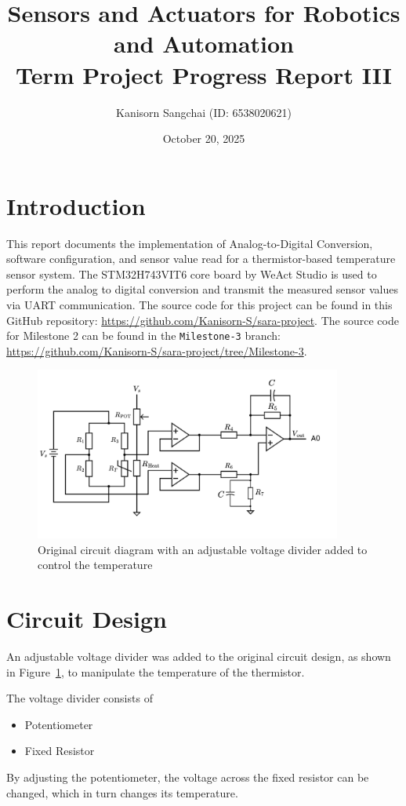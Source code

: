 \documentclass[12pt,a4paper]{article}
\title{Sensors and Actuators for Robotics and
Automation\\Term Project Progress Report III}
\author{Kanisorn Sangchai (ID: 6538020621)}
\date{October 20, 2025}
\begin{document}
\maketitle

\section{Introduction}
This report documents the implementation of Analog-to-Digital Conversion, software configuration, and sensor value read for a thermistor-based temperature sensor system. The STM32H743VIT6 core board by WeAct Studio is used to perform the analog to digital conversion and transmit the measured sensor values via UART communication. The source code for this project can be found in this GitHub repository: \url{https://github.com/Kanisorn-S/sara-project}. The source code for Milestone 2 can be found in the \texttt{Milestone-3} branch: \url{https://github.com/Kanisorn-S/sara-project/tree/Milestone-3}.

\begin{figure}[h]
    \centering
    \includegraphics[width=0.9\textwidth]{images/circuit_diagram.png}
    \caption{Original circuit diagram with an adjustable voltage divider added to control the temperature}
    \label{fig:circuit}
\end{figure}

\section{Circuit Design}
An adjustable voltage divider was added to the original circuit design, as shown in Figure~\ref{fig:circuit}, to manipulate the temperature of the thermistor.

The voltage divider consists of 
\begin{itemize}
    \item Potentiometer
    \item Fixed Resistor
\end{itemize} 
By adjusting the potentiometer, the voltage across the fixed resistor can be changed, which in turn changes its temperature.
\end{document}

